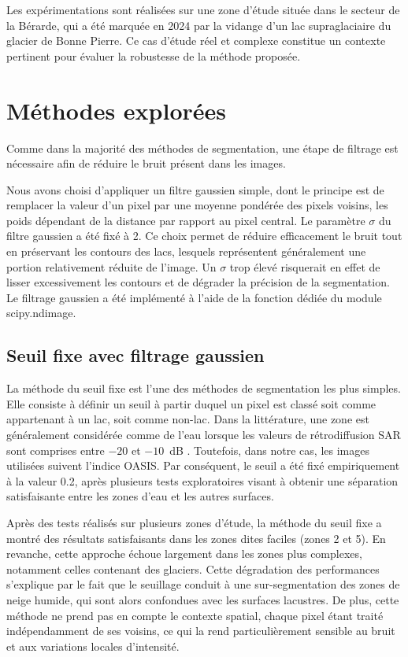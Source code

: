 \documentclass[11pt,a4paper]{article}
\begin{document}
Les expérimentations sont réalisées sur une zone d’étude située dans le secteur de la Bérarde, qui a été marquée en 2024 par la vidange d’un lac supraglaciaire du glacier de Bonne Pierre. Ce cas d’étude réel et complexe constitue un contexte pertinent pour évaluer la robustesse de la méthode proposée.
\section{Méthodes explorées}
Comme dans la majorité des méthodes de segmentation, une étape de filtrage est nécessaire afin de réduire le bruit présent dans les images.

Nous avons choisi d’appliquer un filtre gaussien simple, dont le principe est de remplacer la valeur d’un pixel par une moyenne pondérée des pixels voisins, les poids dépendant de la distance par rapport au pixel central. Le paramètre $\sigma$ du filtre gaussien a été fixé à 2. Ce choix permet de réduire efficacement le bruit tout en préservant les contours des lacs, lesquels représentent généralement une portion relativement réduite de l’image. Un $\sigma$ trop élevé risquerait en effet de lisser excessivement les contours et de dégrader la précision de la segmentation. Le filtrage gaussien a été implémenté à l’aide de la fonction dédiée du module scipy.ndimage.

\subsection{Seuil fixe avec filtrage gaussien}
La méthode du seuil fixe est l’une des méthodes de segmentation les plus simples. Elle consiste à définir un seuil à partir duquel un pixel est classé soit comme appartenant à un lac, soit comme non-lac. 
Dans la littérature, une zone est généralement considérée comme de l’eau lorsque les valeurs de rétrodiffusion SAR sont comprises entre $-20$ et $-10$~dB \cite{rey2022}. Toutefois, dans notre cas, les images utilisées suivent l’indice OASIS. Par conséquent, le seuil a été fixé empiriquement à la valeur 0.2, après plusieurs tests exploratoires visant à obtenir une séparation satisfaisante entre les zones d’eau et les autres surfaces.

Après des tests réalisés sur plusieurs zones d’étude, la méthode du seuil fixe a montré des résultats satisfaisants dans les zones dites faciles (zones 2 et 5). En revanche, cette approche échoue largement dans les zones plus complexes, notamment celles contenant des glaciers. Cette dégradation des performances s’explique par le fait que le seuillage conduit à une sur-segmentation des zones de neige humide, qui sont alors confondues avec les surfaces lacustres. De plus, cette méthode ne prend pas en compte le contexte spatial, chaque pixel étant traité indépendamment de ses voisins, ce qui la rend particulièrement sensible au bruit et aux variations locales d’intensité.
\end{document}
